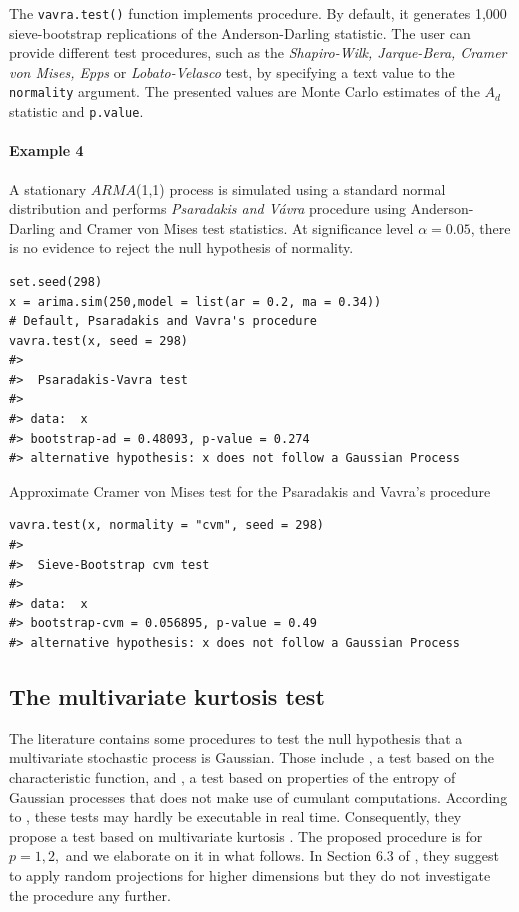 The \texttt{vavra.test()} function implements \citet{psaradakis2020normality} procedure. By default, it generates 1,000 sieve-bootstrap replications of the Anderson-Darling statistic. The user can provide different test procedures, such as the \emph{Shapiro-Wilk, Jarque-Bera, Cramer von Mises, Epps} or \emph{Lobato-Velasco} test, by specifying a text value to the \texttt{normality} argument. The presented values are Monte Carlo estimates of the \(A_d\) statistic and \texttt{p.value}.

\paragraph{Example 4}\label{example-4}

A stationary \(ARMA\)(1,1) process is simulated using a standard normal distribution and performs \emph{Psaradakis and Vávra} procedure using Anderson-Darling and Cramer von Mises test statistics. At significance level \(\alpha = 0.05\), there is no evidence to reject the null hypothesis of normality.

\begin{verbatim}
set.seed(298)
x = arima.sim(250,model = list(ar = 0.2, ma = 0.34))
# Default, Psaradakis and Vavra's procedure
vavra.test(x, seed = 298)
#> 
#>  Psaradakis-Vavra test
#> 
#> data:  x
#> bootstrap-ad = 0.48093, p-value = 0.274
#> alternative hypothesis: x does not follow a Gaussian Process
\end{verbatim}

Approximate Cramer von Mises test for the Psaradakis and Vavra's procedure

\begin{verbatim}
vavra.test(x, normality = "cvm", seed = 298)
#> 
#>  Sieve-Bootstrap cvm test
#> 
#> data:  x
#> bootstrap-cvm = 0.056895, p-value = 0.49
#> alternative hypothesis: x does not follow a Gaussian Process
\end{verbatim}

\subsection{The multivariate kurtosis test}\label{the-multivariate-kurtosis-test}

The literature contains some procedures to test the null hypothesis that a multivariate stochastic process is Gaussian. Those include \citet{moulines1992testing}, a test based on the characteristic function, and \citet{Steinberg1992}, a test based on properties of the entropy of Gaussian processes that does not make use of cumulant computations. According to \citet{el2022normality}, these tests may hardly be executable in real time. Consequently, they propose a test based on multivariate kurtosis \citep{mardia1970measures}. The proposed procedure is for \(p=1,2,\) and we elaborate on it in what follows. In Section 6.3 of \citet{el2022normality}, they suggest to apply random projections for higher dimensions but they do not investigate the procedure any further.

